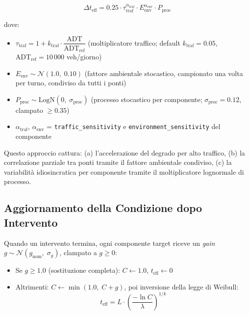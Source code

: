 \documentclass[11pt,a4paper]{article}
\begin{document}
\begin{equation}
  \Delta t_{\text{eff}} = 0.25 \cdot \tau_{\text{traf}}^{\alpha_{\text{traf}}}
                         \cdot E_{\text{env}}^{\alpha_{\text{env}}}
                         \cdot P_{\text{proc}}
\end{equation}

dove:
\begin{itemize}
  \item $\tau_{\text{traf}} = 1 + k_{\text{traf}} \cdot \dfrac{\text{ADT}}{\text{ADT}_{\text{ref}}}$ \quad (moltiplicatore traffico; default $k_{\text{traf}} = 0.05$, $\text{ADT}_{\text{ref}} = 10\,000$ veh/giorno)
  \item $E_{\text{env}} \sim \mathcal{N}(1.0,\; 0.10)$ \quad (fattore ambientale stocastico, campionato una volta per turno, condiviso da tutti i ponti)
  \item $P_{\text{proc}} \sim \text{LogN}(0,\; \sigma_{\text{proc}})$ \quad (processo stocastico per componente; $\sigma_{\text{proc}} = 0.12$, clampato $\geq 0.35$)
  \item $\alpha_{\text{traf}}$, $\alpha_{\text{env}}$ = \texttt{traffic\_sensitivity} e \texttt{environment\_sensitivity} del componente
\end{itemize}

Questo approccio cattura: (a) l'accelerazione del degrado per alto traffico, (b) la correlazione parziale tra ponti tramite il fattore ambientale condiviso, (c) la variabilità idiosincratica per componente tramite il moltiplicatore lognormale di processo.

\subsection{Aggiornamento della Condizione dopo Intervento}

Quando un intervento termina, ogni componente target riceve un \textit{gain} $g \sim \mathcal{N}(g_{\text{nom}},\; \sigma_g)$, clampato a $g \geq 0$:

\begin{itemize}
  \item Se $g \geq 1.0$ (sostituzione completa): $C \leftarrow 1.0$, $t_{\text{eff}} \leftarrow 0$
  \item Altrimenti: $C \leftarrow \min(1.0,\; C + g)$, poi inversione della legge di Weibull:
  \begin{equation}
    t_{\text{eff}} = L \cdot \left(\frac{-\ln C}{\lambda}\right)^{1/k}
  \end{equation}
\end{itemize}
\end{document}
